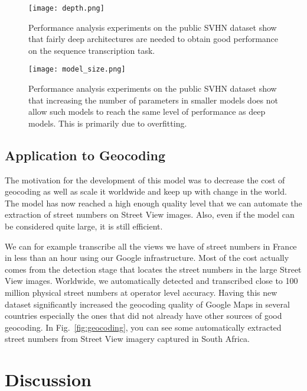 \documentclass{article} \usepackage{comment}
\begin{document}
\begin{figure}
\begin{centering}
\texttt{[image: depth.png]}
\caption{Performance analysis experiments on the public SVHN dataset show that fairly deep
architectures are needed to obtain good performance on the sequence transcription task.}
\label{fig:depth}
\end{centering}
\end{figure}

\begin{figure}
\begin{centering}
\texttt{[image: model\_size.png]}
\caption{Performance analysis experiments on the public SVHN dataset show
that increasing the number of parameters in smaller models does not allow
such models to reach the same level of performance as deep models. This is
primarily due to overfitting.}
\label{fig:model_size}
\end{centering}
\end{figure}


\subsection{Application to Geocoding}

The motivation for the development of this model was to decrease the cost of geocoding as well
as scale it worldwide and keep up with change in the world.
The model has now reached a high enough quality level that we can automate the extraction of
street numbers on Street View images. Also, even if the model can be considered quite large, it is still
efficient.

We can for example transcribe all the views we have of street numbers in France
in less than an hour using our Google infrastructure. Most of the cost actually
comes from the detection stage that locates the street numbers in the large Street View images.
Worldwide, we automatically detected and transcribed close to 100 million physical street numbers
at operator level accuracy. Having this new dataset significantly increased the geocoding quality
of Google Maps in several countries especially the ones that did not already have other sources
of good geocoding. In Fig.~\ref{fig:geocoding}, you can see some automatically extracted street
numbers from Street View imagery captured in South Africa.

\section{Discussion}
\label{sec:discussion}
\end{document}
